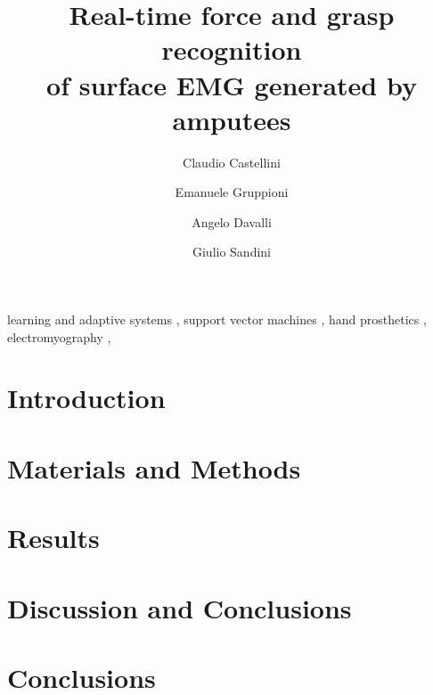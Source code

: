 \documentclass[review,authoryear]{elsarticle}
\begin{document}
\begin{frontmatter}

\title{Real-time force and grasp recognition\\
of surface EMG generated by amputees}

\author[liralab]{Claudio Castellini}
\author[inail]{Emanuele Gruppioni}
\author[inail]{Angelo Davalli}
\author[iit]{Giulio Sandini}

\address[liralab]{LIRA-Lab, University of Genova,
  viale F. Causa 13, 16145 Genova (Italy)}
\address[inail]{INAIL Centro Protesi,
  via Rabuina 14, 40054 Vigorso di Budrio (Bologna, Italy)}
\address[iit]{RBCS Department, Italian Institute of Technology,
  via Morego 30, 16163 Genova (Italy)}


\begin{abstract}
  
\end{abstract}

\begin{keyword}
  learning and adaptive systems \sep
  support vector machines \sep
  hand prosthetics \sep
  electromyography \sep  
\end{keyword}

\end{frontmatter}

\section{Introduction}
\label{sec:intro}


\section{Materials and Methods}
\label{sec:m&ms}


\section{Results}
\label{sec:exp}


\section{Discussion and Conclusions}
\label{sec:disc}


\section{Conclusions}
\label{sec:concl}

\end{document}
